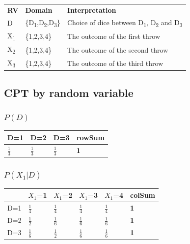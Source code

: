 \documentclass[12pt, letterpaper]{article}
\begin{document}
\begin{tabular}{lll}
\textbf{RV}   & \textbf{Domain}             & \textbf{Interpretation}                             \\
D    & \{D\textsubscript{1},D\textsubscript{2},D\textsubscript{3}\} & Choice of dice between D\textsubscript{1}, D\textsubscript{2} and D\textsubscript{3} \\
X\textsubscript{1} & \{1,2,3,4\}        & The outcome of the first throw             \\
X\textsubscript{2} & \{1,2,3,4\}        & The outcome of the second throw            \\
X\textsubscript{3} & \{1,2,3,4\}        & The outcome of the third throw            
\end{tabular}

\subsection{CPT by random variable}

\subsubsection{$P(D)$}

\begin{tabular}{llll}
D=1         & D=2           & D=3           & \textbf{rowSum} \\
\hline
$\frac{1}{3}$ & $\frac{1}{3}$   & $\frac{1}{3}$   & \textbf{1}
\end{tabular}

\subsubsection{$P(X_1|D)$}
\begin{tabular}{l|llll|l}
    & $X_1$=1       & $X_1$=2       & $X_1$=3       & $X_1$=4       & \textbf{colSum} \\
\hline
D=1 & $\frac{1}{4}$   & $\frac{1}{4}$   & $\frac{1}{4}$   & $\frac{1}{4}$   & \textbf{1}  \\
D=2 & $\frac{1}{2}$   & $\frac{1}{6}$   & $\frac{1}{6}$   & $\frac{1}{6}$   & \textbf{1}  \\
D=3 & $\frac{1}{6}$   & $\frac{1}{2}$   & $\frac{1}{6}$   & $\frac{1}{6}$   & \textbf{1}  \\
\end{tabular}
\end{document}
